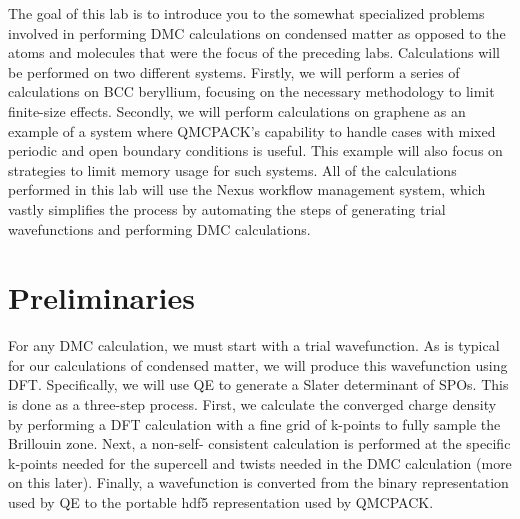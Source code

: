 The goal of this lab is to introduce you to the somewhat specialized problems involved in performing DMC calculations on condensed matter as opposed to the atoms and molecules that were the focus of the preceding labs.   Calculations will be performed on two different systems.  Firstly, we will perform a series of calculations on BCC beryllium, focusing on the necessary methodology to limit finite-size effects.  Secondly, we will perform calculations on graphene as an example of a system where QMCPACK’s capability to handle cases with mixed periodic and open boundary conditions is useful.  This example will also focus on strategies to limit memory usage for such systems.
All of the calculations performed in this lab will use the Nexus workflow management system, which vastly simplifies the process by automating the steps of generating trial wavefunctions and performing DMC calculations.

\newcommand{\vp}{\mathbf{a}^\text{p}}
\newcommand{\vs}{\mathbf{a}^\text{s}} 
\newcommand{\Smat}{\mathbf{S}}
\section{Preliminaries}
For any DMC calculation, we must start with a trial wavefunction. As is typical for our calculations of condensed matter, we will produce this wavefunction using DFT.  Specifically, we will use QE to generate a Slater determinant of SPOs.  This is done as a three-step process.  First, we calculate the converged charge density by performing a DFT calculation with a fine grid of k-points to fully sample the Brillouin zone.  Next, a non-self- consistent calculation is performed at the specific k-points needed for the supercell and twists needed in the DMC calculation (more on this later).  Finally, a wavefunction is converted from the binary representation used by QE to the portable hdf5 representation used by QMCPACK.

